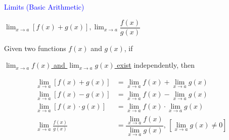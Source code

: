 \documentclass[14pt,fleqn]{extarticle}
\begin{document}
\begin{skill}
\begin{narrow}
\textcolor{blue}{Limits (Basic Arithmetic)} 

\small$\lim_{x\to a}\left[ f(x) + g(x) \right], \lim_{x\to a}\dfrac{f(x)}{g(x)}$
\end{narrow}

\reason 

Given two functions $f(x)$ and $g(x)$, if

\underline{$\lim_{x\to a}f(x)$ and $\lim_{x\to a}g(x)$ exist}
independently, then 

%
\begin{align}
\lim_{x\to a}\left[ f(x) + g(x)\right] &= \lim_{x\to a}f(x) + \lim_{x\to a}g(x)  \\
\lim_{x\to a}\left[ f(x) - g(x)\right] &= \lim_{x\to a}f(x) - \lim_{x\to a}g(x) \\
\lim_{x\to a}\left[ f(x)\cdot g(x)\right] &= \lim_{x\to a}f(x)\cdot\lim_{x\to a}g(x)  \\
\lim_{x\to a}\frac{f(x)}{g(x)} &= \dfrac{\lim_{x\to a}f(x)}{\lim_{x\to a}g(x)},\, \left[ \lim_{x\to a}g(x) \neq 0\right]
\end{align}  
\end{skill}
\end{document}
